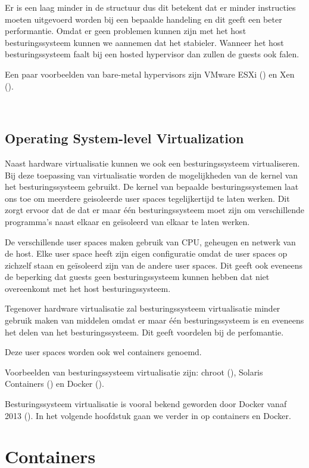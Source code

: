 \documentclass[pdftex,a4paper,12pt,twoside]{report}
\begin{document}
Er is een laag minder in de structuur dus dit betekent dat er minder instructies moeten uitgevoerd worden bij een bepaalde handeling en dit geeft een beter performantie. Omdat er geen problemen kunnen zijn met het host besturingssysteem kunnen we aannemen dat het stabieler. Wanneer het host besturingssysteem faalt bij een hosted hypervisor dan zullen de guests ook falen.

Een paar voorbeelden van bare-metal hypervisors zijn VMware ESXi (\cite{VMware2016a}) en Xen (\cite{XenProject2016}).

\\

\section{Operating System-level Virtualization}

Naast hardware virtualisatie kunnen we ook een besturingssysteem virtualiseren. Bij deze toepassing van virtualisatie worden de mogelijkheden van de kernel van het besturingssysteem gebruikt. De kernel van bepaalde besturingssystemen laat ons toe om meerdere geisoleerde user spaces tegelijkertijd te laten werken. Dit zorgt ervoor dat de dat er maar één besturingssysteem moet zijn om verschillende programma's naast elkaar en geïsoleerd van elkaar te laten werken.

De verschillende user spaces maken gebruik van CPU, geheugen en netwerk van de host. Elke user space heeft zijn eigen configuratie omdat de user spaces op zichzelf staan en geïsoleerd zijn van de andere user spaces. Dit geeft ook eveneens de beperking dat guests geen besturingssysteem kunnen hebben dat niet overeenkomt met het host besturingssysteem.

Tegenover hardware virtualisatie zal besturingssysteem virtualisatie minder gebruik maken van middelen omdat er maar één besturingssysteem is en eveneens het delen van het besturingssysteem. Dit geeft voordelen bij de perfomantie.

Deze user spaces worden ook wel containers genoemd.

Voorbeelden van besturingssysteem virtualisatie zijn: chroot (\cite{Linux}), Solaris Containers (\cite{Oracle2016a}) en Docker (\cite{Docker2016}).

Besturingssysteem virtualisatie is vooral bekend geworden door Docker vanaf 2013 (\cite{Hykes2013}). In het volgende hoofdstuk gaan we verder in op containers en Docker.

\chapter{Containers}
\label{ch:Containers}
\end{document}

